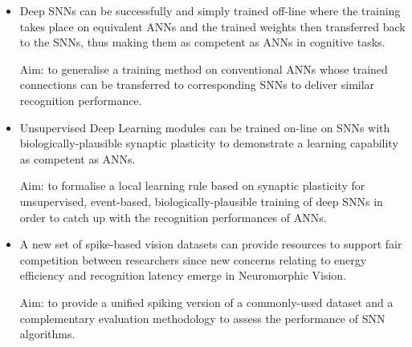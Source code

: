 \begin{itemize}
%

	\item 
	Deep SNNs can be successfully and simply trained off-line where the training takes place on equivalent ANNs and the trained weights then transferred back to the SNNs, thus making them as competent as ANNs in cognitive tasks. 
	
	Aim: to generalise a training method on conventional ANNs whose trained connections can be transferred to corresponding SNNs to deliver similar recognition performance.

	\item 
	Unsupervised Deep Learning modules can be trained on-line on SNNs with biologically-plausible synaptic plasticity to demonstrate a learning capability as competent as ANNs.

	Aim: to formalise a local learning rule based on synaptic plasticity for unsupervised, event-based, biologically-plausible training of deep SNNs in order to catch up with the recognition performances of ANNs.

	\item 
	A new set of spike-based vision datasets can provide resources to support fair competition between researchers since new concerns relating to energy efficiency and recognition latency emerge in Neuromorphic Vision.

	Aim: to provide a unified spiking version of a commonly-used dataset and a complementary evaluation methodology to assess the performance of SNN algorithms.
\end{itemize}


